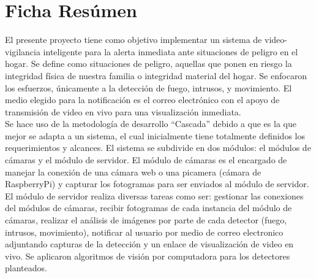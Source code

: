 \chapter{Ficha Resúmen}

El presente proyecto tiene como objetivo implementar un sistema de video-vigilancia inteligente para la alerta inmediata ante situaciones de peligro en el hogar. Se define como situaciones de peligro, aquellas que ponen en riesgo la integridad física de nuestra familia o integridad material del hogar. Se enfocaron los esfuerzos, únicamente a la detección de fuego, intrusos, y movimiento. El medio elegido para la notificación es el correo electrónico con el apoyo de transmisión de video en vivo para una visualización inmediata.\\

Se hace uso de la metodología de desarrollo ``Cascada'' debido a que es la que mejor se adapta a un sistema, el cual inicialmente tiene totalmente definidos los requerimientos y alcances. El sistema se subdivide en dos módulos: el módulos de cámaras y el módulo de servidor.  El módulo de cámaras es el encargado de manejar la conexión de una cámara web o una picamera (cámara de RaspberryPi) y capturar los fotogramas para ser enviados al módulo de servidor. El módulo de servidor realiza diversas tareas como ser: gestionar las conexiones del módulos de cámaras, recibir fotogramas de cada instancia del módulo de cámaras, realizar el análisis de imágenes por parte de cada detector (fuego, intrusos, movimiento), notificar al usuario por medio de correo electronico adjuntando capturas de la detección y un enlace de visualización de video en vivo. Se aplicaron algoritmos de visión por computadora para los detectores planteados.\\